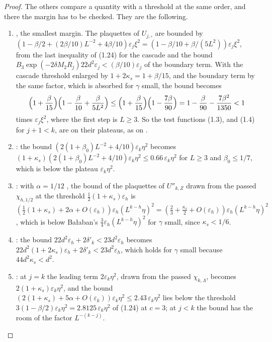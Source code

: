 \documentclass[11pt]{preprint}
\numberwithin{equation}{section}
\theoremstyle{definition}
\theoremstyle{remark}
\theoremstyle{plain}
\begin{document}
\begin{proof}
The others compare a quantity with a threshold at the same order, and there the margin has to be checked. They are the following.
\begin{enumerate}[label=(\roman*)]
\item \cite[(1.31), p.~184]{BalabanLFR1}, the smallest margin. The plaquettes of $U_{j,\square}$ are bounded by $(1 - \beta/2 + (2\beta/10)L^{-2} + 4\beta/10)\varepsilon_j\xi^2 = (1 - \beta/10 + \beta/(5L^2))\varepsilon_j\xi^2$, from the last inequality of (1.24) for the cascade and the bound $B_3\exp(-2\delta M_2R_j)22d^2\varepsilon_j < (\beta/10)\varepsilon_j$ of the boundary term. With the cascade threshold enlarged by $1 + 2\kappa_s = 1 + \beta/15$, and the boundary term by the same factor, which is absorbed for $\gamma$ small, the bound becomes
\begin{equation}\label{eq:smallest-margin}
    \Bigl(1 + \frac{\beta}{15}\Bigr)\Bigl(1 - \frac{\beta}{10} + \frac{\beta}{5L^2}\Bigr) \leq \Bigl(1 + \frac{\beta}{15}\Bigr)\Bigl(1 - \frac{7\beta}{90}\Bigr) = 1 - \frac{\beta}{90} - \frac{7\beta^2}{1350} < 1
\end{equation}
times $\varepsilon_j\xi^2$, where the first step is $L \geq 3$. So the test functions (1.3), and (1.4) for $j + 1 < k$, are on their plateaus, as on \cite[p.~184]{BalabanLFR1}.
\item \cite[(3.8), p.~266]{BalabanCRE}: the bound $(2(1 + \beta_0)L^{-2} + 4/10)\varepsilon_k\eta^2$ becomes $(1 + \kappa_s)(2(1 + \beta_0)L^{-2} + 4/10)\varepsilon_k\eta^2 \leq 0.66\,\varepsilon_k\eta^2$ for $L \geq 3$ and $\beta_0 \leq 1/7$, which is below the plateau $\varepsilon_k\eta^2$.
\item \cite[(1.96), p.~199]{BalabanLFR1}: with $\alpha = 1/12$ \cite[p.~199]{BalabanLFR1}, the bound of the plaquettes of $U''_{k,Z}$ drawn from the passed $\chi_{h,1/2}$ at the threshold $\frac12(1 + \kappa_s)\varepsilon_h$ is $(\frac12(1 + \kappa_s) + 2\alpha + O(\varepsilon_h))\varepsilon_h(L^{k-h}\eta)^2 = (\frac23 + \frac{\kappa_s}{2} + O(\varepsilon_h))\varepsilon_h(L^{k-h}\eta)^2$, which is below Ba{\l}aban's $\frac34\varepsilon_h(L^{k-h}\eta)^2$ for $\gamma$ small, since $\kappa_s < 1/6$.
\item \cite[p.~199]{BalabanLFR1}: the bound $22d^2\varepsilon_h + 2\delta'_k < 23d^2\varepsilon_h$ becomes $22d^2(1 + 2\kappa_s)\varepsilon_h + 2\delta'_k < 23d^2\varepsilon_h$, which holds for $\gamma$ small because $44d^2\kappa_s < d^2$.
\item \cite[(1.98), p.~200]{BalabanLFR1}: at $j = k$ the leading term $2\varepsilon_k\eta^2$, drawn from the passed $\chi_{k,\Lambda}$, becomes $2(1 + \kappa_s)\varepsilon_k\eta^2$, and the bound $(2(1 + \kappa_s) + 5\alpha + O(\varepsilon_k))\varepsilon_k\eta^2 \leq 2.43\,\varepsilon_k\eta^2$ lies below the threshold $3(1 - \beta/2)\varepsilon_k\eta^2 = 2.8125\,\varepsilon_k\eta^2$ of (1.24) at $c = 3$; at $j < k$ the bound has the room of the factor $L^{-(k-j)}$.
\end{enumerate}


\end{proof}
\end{document}
